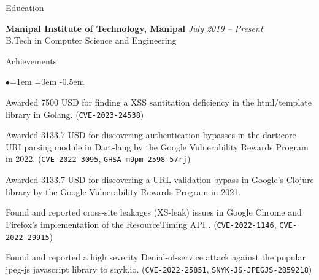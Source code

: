 \documentclass{resume} %
\date{\today}
\begin{document}
\begin{rSection}{Education}

{\bf Manipal Institute of Technology, Manipal} \hfill {\em July 2019 -- Present}  \\ B.Tech in Computer Science and Engineering\hfill
\end{rSection}
\begin{rSection}{Achievements}
\begin{list}{$\bullet$}{\leftmargin=1em \itemindent=0em}
\itemsep -0.5em
\item Awarded 7500 USD for finding a XSS santitation deficiency in the html/template library in Golang. (\texttt{CVE-2023-24538})
\item Awarded 3133.7 USD for discovering authentication bypasses in the dart:core URI parsing module in Dart-lang by the Google Vulnerability Rewards Program in 2022. (\texttt{CVE-2022-3095}, \texttt{GHSA-m9pm-2598-57rj})
\item Awarded 3133.7 USD for discovering a URL validation bypass in Google's Clojure library by the Google Vulnerability Rewards Program in 2021.
\item Found and reported cross-site leakages (XS-leak) issues in Google Chrome and Firefox's implementation of the ResourceTiming API . (\texttt{CVE-2022-1146}, \texttt{CVE-2022-29915})
\item Found and reported a high severity Denial-of-service attack against the popular jpeg-js javascript library to snyk.io. \linebreak(\texttt{CVE-2022-25851}, \texttt{SNYK-JS-JPEGJS-2859218})
\end{list}
\end{rSection}
\end{document}
